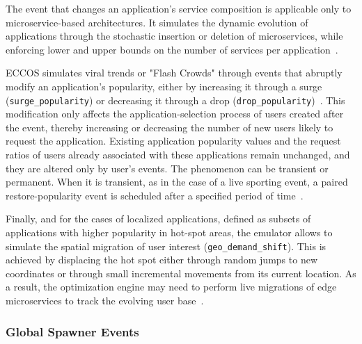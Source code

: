 \documentclass[ASNA]{USG} %
\begin{document}
The event that changes an application's service composition is applicable only to microservice-based architectures. It simulates the dynamic evolution of applications through the stochastic insertion or deletion of microservices, while enforcing lower and upper bounds on the number of services per application~\cite{Fu2022Adaptive}.


\textsc{ECCOS} simulates viral trends or "Flash Crowds" through events that abruptly modify an application's popularity, either by increasing it through a surge (\texttt{surge\_popularity}) or decreasing it through a drop (\texttt{drop\_popularity})~\cite{10.1145/2068816.2068867}. This modification only affects the application-selection process of users created after the event, thereby increasing or decreasing the number of new users likely to request the application. Existing application popularity values and the request ratios of users already associated with these applications remain unchanged, and they are altered only by user's events. The phenomenon can be transient or permanent. When it is transient, as in the case of a live sporting event, a paired restore-popularity event is scheduled after a specified period of time~\cite{10.1145/2068816.2068867}.

Finally, and for the cases of localized applications, defined as subsets of applications with higher popularity in hot-spot areas, the emulator allows to simulate the spatial migration of user interest (\texttt{geo\_demand\_shift}). This is achieved by displacing the hot spot either through random jumps to new coordinates or through small incremental movements from its current location. As a result, the optimization engine may need to perform live migrations of edge microservices to track the evolving user base~\cite{Wang2019Delay}.




\subsubsection{Global Spawner Events}
\label{subsec:global_spawner}
\end{document}
